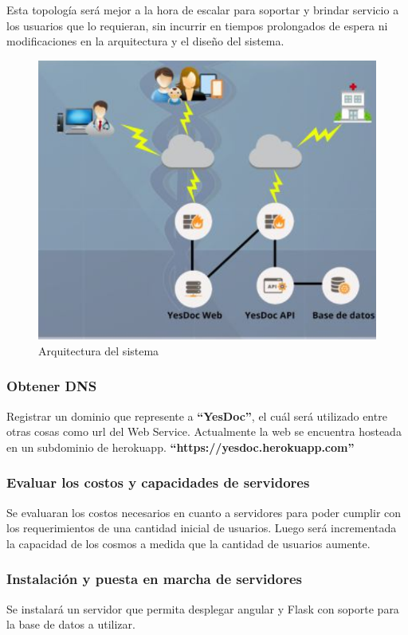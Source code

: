 \documentclass[a4paper,12pt]{article}
\begin{document}
Esta topología será mejor a la hora de escalar para soportar y brindar servicio a los usuarios que lo requieran, sin incurrir en tiempos prolongados de espera ni modificaciones en la arquitectura y el diseño del sistema.


 \begin{figure}
  \centering
  \includegraphics[width=.8\textwidth]{img/esq_funcionamiento}
  \caption{Arquitectura del sistema}
  \label{esq_funcionamiento}
\end{figure}


\subsubsection{Obtener DNS}
Registrar un dominio que represente a \textbf{``YesDoc''}, el cuál será utilizado entre otras cosas como url del Web Service.
Actualmente la web se encuentra hosteada en un subdominio de herokuapp. \textbf{``https://yesdoc.herokuapp.com''}

\subsubsection{Evaluar los costos y capacidades de servidores}
Se evaluaran los costos necesarios en cuanto a servidores para poder  cumplir con los requerimientos de una cantidad inicial de usuarios. Luego será incrementada la capacidad de los cosmos a medida que la cantidad de usuarios aumente. 

\subsubsection{Instalación y puesta en marcha de servidores}
Se instalará un servidor que permita desplegar angular y Flask con soporte para la base de     datos a utilizar. 
\end{document}
